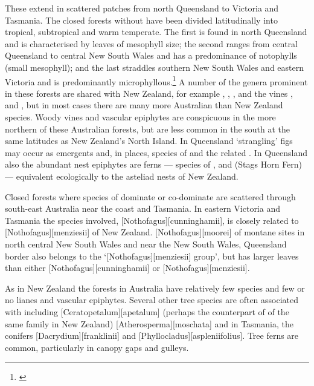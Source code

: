 These extend in scattered patches from north Queensland to Victoria and Tasmania.
The closed forests without  have been divided latitudinally into tropical, subtropical and warm temperate.
The first is found in north Queensland and is characterised by leaves of mesophyll size; the second ranges from central Queensland to central New South Wales and has a predominance of notophylls (small mesophyll); and the last straddles southern New South Wales and eastern Victoria and is predominantly microphyllous.\footnote{\cite{webb1959physiognomic}}
A number of the genera prominent in these forests are shared with New Zealand, for example , , ,  and the vines ,  and , but in most cases there are many more Australian than New Zealand species.
Woody vines and vascular epiphytes are conspicuous in the more northern of these Australian forests, but are less common in the south at the same latitudes as New Zealand's North Island.
In Queensland `strangling' figs may occur as emergents and, in places, species of  and the related .
In Queensland also the abundant nest epiphytes are ferns --- species of ,  and  (Stags Horn Fern) --- equivalent ecologically to the asteliad nests of New Zealand.

Closed forests where species of  dominate or co-dominate are scattered through south-east Australia near the coast and Tasmania.
In eastern Victoria and Tasmania the species involved, [Nothofagus][cunninghamii], is closely related to [Nothofagus][menziesii] of New Zealand. [Nothofagus][moorei] of montane sites in north central New South Wales and near the New South Wales, Queensland border also belongs to the `[Nothofagus][menziesii] group', but has larger leaves than either [Nothofagus][cunninghamii] or [Nothofagus][menziesii].

As in New Zealand the  forests in Australia have relatively few species and few or no lianes and vascular epiphytes.
Several other tree species are often associated with  including [Ceratopetalum][apetalum] (perhaps the counterpart of  of the same family in New Zealand) [Atherosperma][moschata] and in Tasmania, the conifers [Dacrydium][franklinii] and [Phyllocladus][aspleniifolius].
Tree ferns are common, particularly in canopy gaps and gulleys.

